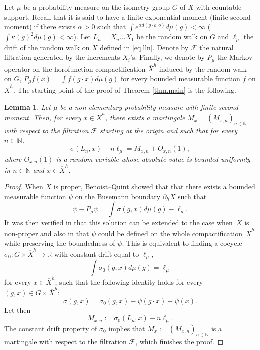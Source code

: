 \documentclass[JEP,XML,SOM,Unicode,published]{cedram}
\theoremstyle{plain}
\newtheorem{lemma}[theorem]{Lemma}
\theoremstyle{definition}
\newcommand\R{\mathbb{R}}
\newcommand\N{\mathbb{N}}
\begin{document}
Let $\mu$ be a probability measure on the isometry group $G$ of $X$ with countable support. Recall that it is said to have a finite exponential moment (\resp finite second moment) if there exists $\alpha>0$ such that $\int e^{\alpha d(g \cdot o, o)} d\mu(g)<\infty$ (\resp $\int \kappa(g)^2 d\mu(g)<\infty$). Let $L_n=X_n\dots X_1$ be the random walk on $G$ and $\ell_{\mu}$ the drift of the random walk on $X$ defined in \eqref{eq.lln}.
Denote by $\mathcal{F}$ the natural filtration generated by the increments $X_i$'s. Finally, we denote by $P_{\mu}$ the Markov operator on the horofunction compactification $\overline{X}^h$ induced by the random walk on $G$, \ie $P_{\mu}f(x)=\int{f(g\cdot x) d\mu(g)}$ for every bounded measurable function $f$ on $\overline{X}^h$. The starting point of the proof of Theorem \ref{thm.main} is the following.

\begin{lemma}\label{lemma.martingale.dec}
Let $\mu$ be a non-elementary probability measure with finite second moment. Then, for every $x\in \overline{X}^h$, there exists a martingale $M_x=(M_{x,n})_{n\in \N}$ with respect to the filtration $\mathcal{F}$ starting at the origin and such that for every $n\in \N$,\vspace*{-3pt}
\[
\sigma(L_n, x)-n\ell_{\mu} = M_{x,n} + O_{x,n}(1),
\]
where $O_{x,n}(1)$ is a random variable whose absolute value is bounded uniformly in $n\in \N$ and $x\in \overline{X}^h$.
\end{lemma}

\begin{proof}
When $X$ is proper, Benoist--Quint \cite[Prop.\,4.6]{BQ.hyperbolic} showed that that there exists a bounded measurable function $\psi$ on the Busemann boundary $\partial_h X$ such that
\[
\psi - P_{\mu} \psi = \int{\sigma(g,x) d\mu(g)} - \ell_\mu.
\]
It was then verified in \cite{horbez} that this solution can be extended to the case when~$X$ is non-proper and also in \cite{aoun-sert} that $\psi$ could be defined on the whole compactification~$\overline{X}^h$ while preserving the boundedness of $\psi$. This is equivalent to finding a cocycle \hbox{$\sigma_0: G\times \overline{X}^h \to \R$} with constant drift equal to $\ell_{\mu}$, \ie 
\[
\int{\sigma_0(g,x) d\mu(g)}=\ell_{\mu}
\]
for every $x\in \overline{X}^h$, such that the following identity holds for every $(g,x)\in G\times \overline{X}^h $:
\begin{equation}\label{cocycle.decomposition}\sigma(g,x) = \sigma_0(g,x) - \psi(g\cdot x)+\psi(x).\end{equation}
Let then
\begin{equation}\label{equation.martingale}M_{x,n}:=\sigma_0(L_n, x)-n\ell_{\mu}.\end{equation}
The constant drift property of $\sigma_0$ implies that $M_x:=(M_{x,n})_{n\in \N}$ is a martingale with respect to the filtration $\mathcal{F}$, which finishes the proof.
\end{proof}
\end{document}
